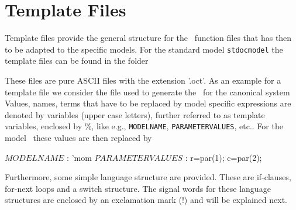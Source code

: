 \section{Template Files}
\label{sec:TemplateFiles}
Template files provide the general structure for the \MATL\ function files that has then to be adapted to the specific models. For the standard model \lstinline+stdocmodel+ the template files can be found in the folder
\begin{pathlisting}
\ocmat\model\standardmodel\templatefiles
\end{pathlisting}
These files are pure ASCII files with the extension '.oct'. As an example for a template file we consider the file used to generate the \mfile\ for the canonical system
Values, names, terms that have to be replaced by model specific expressions are denoted by variables (upper case letters), further referred to as template variables, enclosed by \%, like e.g., \lstinline+MODELNAME+, \lstinline+PARAMETERVALUES+, etc.. For the model \MoM\ these values are then replaced by
\begin{matlab}
$MODELNAME$ : 'mom
$PARAMETERVALUES$ :
r=par(1);
c=par(2);
\end{matlab}
Furthermore, some simple language structure are provided. These are if-clauses, for-next loops and a switch structure. The signal words for these language structures are enclosed by an exclamation mark (!) and will be explained next.

